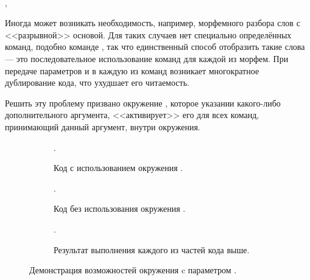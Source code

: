 \ExplSyntaxOn
\begin{tcolorbox}
    \manModifier[env] \manColon{}
    \manCode{[\manKwargs{}]}
    \\
    \manTab{} \manKwargs{} \manColon{} , \manSpace{} 
\end{tcolorbox}
\ExplSyntaxOff

Иногда может возникать необходимость, например, морфемного разбора слов с <<разрывной>> основой. Для таких случаев нет специально
определённых команд, подобно команде , так что единственный способ отобразить такие слова --- это
последовательное использование команд для каждой из морфем. При передаче параметров  и  в каждую из
команд возникает многократное дублирование кода, что ухудшает его читаемость.

Решить эту проблему призвано окружение , которое указании какого-либо дополнительного аргумента, <<активирует>> его для всех команд, принимающий данный аргумент, внутри окружения.
\begin{figure}[htp!]
    \centering
    \begin{subfigure}{\textwidth}
        \begin{Latexcode}
            \begin{rslingu}[color]
                  
                 .
            \end{rslingu}
        \end{Latexcode}
        \caption{Код с использованием окружения .}
    \end{subfigure}\vspace*{.75cm}
    \begin{subfigure}{\textwidth}
        \begin{Latexcode}
             
             
            .
        \end{Latexcode}
        \caption{Код без использования окружения .}
    \end{subfigure}\vspace*{.75cm}
    \begin{subfigure}{.9\textwidth}
        \centering
        \begin{rslingu}[color]
              
             .
        \end{rslingu}
        \caption{Результат выполнения каждого из частей кода выше.}
    \end{subfigure}
    \caption{Демонстрация возможностей окружения  c параметром .}
\end{figure}



